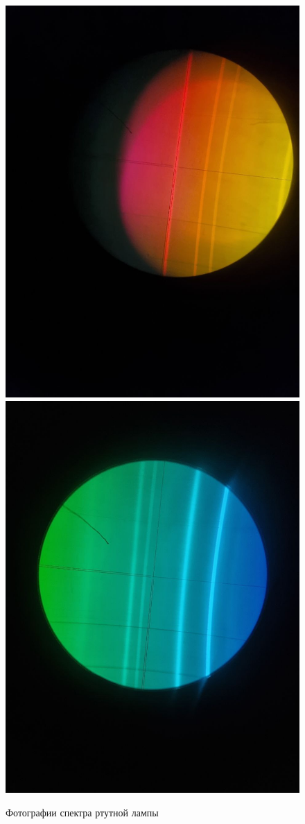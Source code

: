 \documentclass[a4paper,12pt]{article}
\begin{document}
\begin{figure}[H]
    \includegraphics[scale=0.2]{red.png}
    \includegraphics[scale=0.2]{light_blue.png}
    \caption{Фотографии спектра ртутной лампы}
\end{figure}
\end{document}
